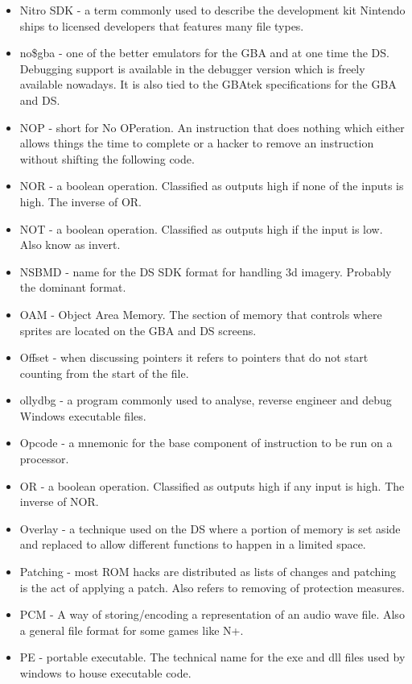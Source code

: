 \documentclass[
]{book}
\begin{document}
\begin{itemize}
\item
  Nitro SDK - a term commonly used to describe the development kit Nintendo ships to licensed developers that features many file types.
\item
  no\$gba - one of the better emulators for the GBA and at one time the DS. Debugging support is available in the debugger version which is freely available nowadays. It is also tied to the GBAtek specifications for the GBA and DS.
\item
  NOP - short for No OPeration. An instruction that does nothing which either allows things the time to complete or a hacker to remove an instruction without shifting the following code.
\item
  NOR - a boolean operation. Classified as outputs high if none of the inputs is high. The inverse of OR.
\item
  NOT - a boolean operation. Classified as outputs high if the input is low. Also know as invert.
\item
  NSBMD - name for the DS SDK format for handling 3d imagery. Probably the dominant format.
\item
  OAM - Object Area Memory. The section of memory that controls where sprites are located on the GBA and DS screens.
\item
  Offset - when discussing pointers it refers to pointers that do not start counting from the start of the file.
\item
  ollydbg - a program commonly used to analyse, reverse engineer and debug Windows executable files.
\item
  Opcode - a mnemonic for the base component of instruction to be run on a processor.
\item
  OR - a boolean operation. Classified as outputs high if any input is high. The inverse of NOR.
\item
  Overlay - a technique used on the DS where a portion of memory is set aside and replaced to allow different functions to happen in a limited space.
\item
  Patching - most ROM hacks are distributed as lists of changes and patching is the act of applying a patch. Also refers to removing of protection measures.
\item
  PCM - A way of storing/encoding a representation of an audio wave file. Also a general file format for some games like N+.
\item
  PE - portable executable. The technical name for the exe and dll files used by windows to house executable code.

\end{itemize}
\end{document}
